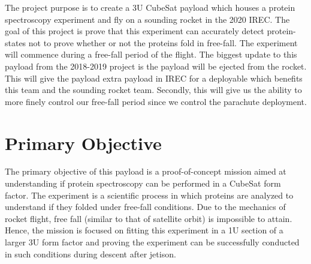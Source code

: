\documentclass[conference]{IEEEtran} %
\begin{document}
The project purpose is to create a 3U CubeSat payload which houses a protein spectroscopy experiment and fly on a sounding rocket in the 2020 IREC. The goal of this project is prove that 
this experiment can accurately detect protein-states not to prove whether or not the proteins fold in free-fall. The experiment will commence during a free-fall period of the flight. The biggest update to this payload from 
the 2018-2019 project is the payload will be ejected from the rocket. This will give the payload extra payload in IREC for a deployable which benefits this team and the sounding 
rocket team. Secondly, this will give us the ability to more finely control our free-fall period since we control the parachute deployment. 

\section{Primary Objective}
\label{sec:primary-obj}

The primary objective of this payload is a proof-of-concept mission aimed at understanding if protein spectroscopy can be performed in a CubeSat form factor. The experiment
is a scientific process in which proteins are analyzed to understand if they folded under free-fall conditions. Due to the mechanics of rocket flight, free fall (similar to that
of satellite orbit) is impossible to attain. Hence, the mission is focused on fitting this experiment in a 1U section of a larger 3U form factor and proving the experiment can be 
successfully conducted in such conditions during descent after jetison. 
\end{document}
